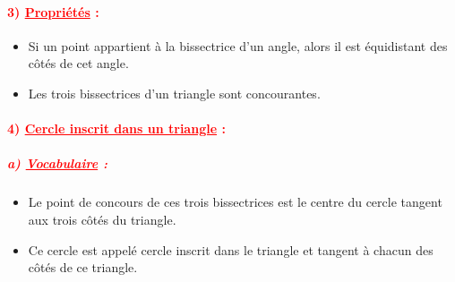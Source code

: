 \documentclass[12pt,a4paper]{article}
\begin{document}
\begin{center}
\end{center}

\paragraph{\textcolor{red}{3) \underline{Propriétés} :}}
\begin{itemize}
    \item[$\checkmark$] Si un point appartient à la bissectrice d'un angle, alors il est équidistant des côtés de cet angle.
    \item[$\checkmark$] Les trois bissectrices d'un triangle sont concourantes.
\end{itemize}

\paragraph{\textcolor{red}{4) \underline{Cercle inscrit dans un triangle} :}}

\subparagraph{\textcolor{red}{a) \underline{Vocabulaire} :}}
\begin{itemize}
    \item[$\checkmark$] Le point de concours de ces trois bissectrices est le centre du cercle tangent aux trois côtés du triangle.
    \item[$\checkmark$] Ce cercle est appelé cercle inscrit dans le triangle et tangent à chacun des côtés de ce triangle.
\end{itemize}
\end{document}
